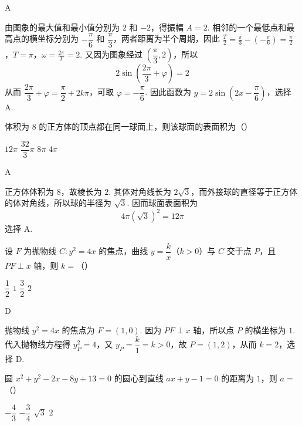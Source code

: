 \begin{answer}
A
\end{answer}

\begin{solution}
由图象的最大值和最小值分别为 \(2\) 和 \(-2\)，得振幅 \(A=2\). 相邻的一个最低点和最高点的横坐标分别为 \(-\dfrac{\pi}{6}\) 和 \(\dfrac{\pi}{3}\)，两者距离为半个周期，因此
\(\frac{T}{2}=\frac{\pi}{3}-\left(-\frac{\pi}{6}\right)=\frac{\pi}{2}\)，\(T=\pi\)，\(\omega=\frac{2\pi}{T}=2\).
又因为图象经过 \(\left(\dfrac{\pi}{3},2\right)\)，所以
\[
2\sin\left(\frac{2\pi}{3}+\varphi\right)=2
\]
从而 \(\dfrac{2\pi}{3}+\varphi=\dfrac{\pi}{2}+2k\pi\)，可取 \(\varphi=-\dfrac{\pi}{6}\). 因此函数为 \(y=2\sin\left(2x-\dfrac{\pi}{6}\right)\)，选择 A.
\end{solution}


\begin{problem}
体积为 \(8\) 的正方体的顶点都在同一球面上，则该球面的表面积为（\quad）

\choices
    {\(12\pi\)}
    {\(\dfrac{32}{3}\pi\)}
    {\(8\pi\)}
    {\(4\pi\)}
\end{problem}

\begin{answer}
A
\end{answer}

\begin{solution}
正方体体积为 \(8\)，故棱长为 \(2\). 其体对角线长为 \(2\sqrt3\)，而外接球的直径等于正方体的体对角线，所以球的半径为 \(\sqrt3\). 因而球面表面积为
\[
4\pi(\sqrt3)^2=12\pi
\]
选择 A.
\end{solution}


\begin{problem}
设 \(F\) 为抛物线 \(C:y^2=4x\) 的焦点，曲线 \(y=\dfrac{k}{x}\)（\(k>0\)）与 \(C\) 交于点 \(P\)，且 \(PF\perp x\) 轴，则 \(k=\)（\quad）

\choices
    {\(\dfrac12\)}
    {\(1\)}
    {\(\dfrac32\)}
    {\(2\)}
\end{problem}

\begin{answer}
D
\end{answer}

\begin{solution}
抛物线 \(y^2=4x\) 的焦点为 \(F=(1,0)\). 因为 \(PF\perp x\) 轴，所以点 \(P\) 的横坐标为 \(1\). 代入抛物线方程得 \(y_P^2=4\)，又 \(y_P=\dfrac{k}{1}=k>0\)，故 \(P=(1,2)\)，从而 \(k=2\)，选择 D.
\end{solution}


\begin{problem}
圆 \(x^2+y^2-2x-8y+13=0\) 的圆心到直线 \(ax+y-1=0\) 的距离为 \(1\)，则 \(a=\)（\quad）

\choices
    {\(-\dfrac43\)}
    {\(-\dfrac34\)}
    {\(\sqrt3\)}
    {\(2\)}
\end{problem}


